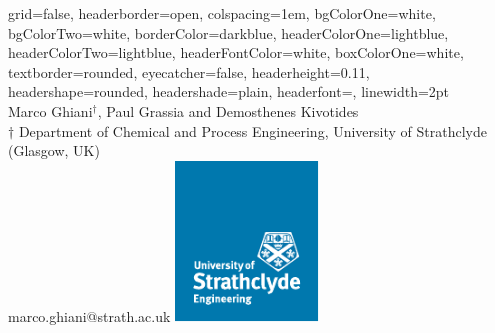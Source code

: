 \documentclass[a0paper,portrait]{baposter}
\begin{document}

\begin{poster}
{
grid=false,
headerborder=open, 
colspacing=1em, %
bgColorOne=white,
bgColorTwo=white, %
borderColor=darkblue, %
headerColorOne=lightblue, %
headerColorTwo=lightblue, %
headerFontColor=white, %
boxColorOne=white, %
textborder=rounded, %
eyecatcher=false, %
headerheight=0.11\textheight, %
headershape=rounded, %
headershade=plain,
headerfont=\Large\textsf, %
linewidth=2pt %
}
{}
%
%
{
\textsf %
{\color{lightblue}{CFD -- Polymer Stretching by Turbulent \\Flow Field}
}
} 
{\sf\vspace{0.5em}\\
Marco Ghiani$^\dagger$, Paul Grassia and Demosthenes Kivotides
\vspace{0.1em}\\
\small{$\dagger$ Department of Chemical and Process Engineering, University of Strathclyde (Glasgow, UK) 
\vspace{0.2em}\\
marco.ghiani@strath.ac.uk}
}
{\includegraphics[width=3.8cm]{strath.pdf}} %



\end{poster}
\end{document}
